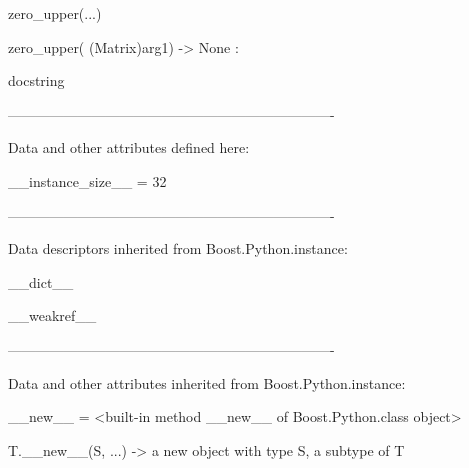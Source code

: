 \documentclass[letterpaper,10pt,english]{sphinxmanual}
\begin{document}
\begin{description}
\begin{description}
\begin{DUlineblock}{0em}
\item[] zero\_upper(...)
\item[]
\begin{DUlineblock}{\DUlineblockindent}
\item[] zero\_upper( (Matrix)arg1) -\textgreater{} None :
\item[]
\begin{DUlineblock}{\DUlineblockindent}
\item[] docstring
\item[] 
\end{DUlineblock}
\end{DUlineblock}
\item[] ----------------------------------------------------------------------
\item[] Data and other attributes defined here:
\item[] 
\item[] \_\_instance\_size\_\_ = 32
\item[] 
\item[] ----------------------------------------------------------------------
\item[] Data descriptors inherited from Boost.Python.instance:
\item[] 
\item[] \_\_dict\_\_
\item[] 
\item[] \_\_weakref\_\_
\item[] 
\item[] ----------------------------------------------------------------------
\item[] Data and other attributes inherited from Boost.Python.instance:
\item[] 
\item[] \_\_new\_\_ = \textless{}built-in method \_\_new\_\_ of Boost.Python.class object\textgreater{}
\item[]
\begin{DUlineblock}{\DUlineblockindent}
\item[] T.\_\_new\_\_(S, ...) -\textgreater{} a new object with type S, a subtype of T
\end{DUlineblock}
\end{DUlineblock}


\end{description}
\end{description}
\end{document}
